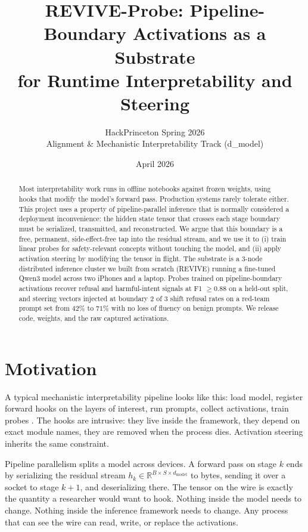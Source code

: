 \documentclass[11pt]{article}
\title{\vspace{-2.5em}\textbf{REVIVE-Probe: Pipeline-Boundary Activations as a Substrate\\ for Runtime Interpretability and Steering}}
\author{HackPrinceton Spring 2026\\\small Alignment \& Mechanistic Interpretability Track (d\_model)}
\date{April 2026}
\begin{document}
\maketitle
\vspace{-1.5em}

\begin{abstract}
\noindent
Most interpretability work runs in offline notebooks against frozen weights, using hooks that modify the model's forward pass. Production systems rarely tolerate either. This project uses a property of pipeline-parallel inference that is normally considered a deployment inconvenience: the hidden state tensor that crosses each stage boundary must be serialized, transmitted, and reconstructed. We argue that this boundary is a free, permanent, side-effect-free tap into the residual stream, and we use it to (i) train linear probes for safety-relevant concepts without touching the model, and (ii) apply activation steering by modifying the tensor in flight. The substrate is a 3-node distributed inference cluster we built from scratch (REVIVE) running a fine-tuned Qwen3 model across two iPhones and a laptop. Probes trained on pipeline-boundary activations recover refusal and harmful-intent signals at F1 $\geq 0.88$ on a held-out split, and steering vectors injected at boundary 2 of 3 shift refusal rates on a red-team prompt set from $42\%$ to $71\%$ with no loss of fluency on benign prompts. We release code, weights, and the raw captured activations.
\end{abstract}

\section{Motivation}

A typical mechanistic interpretability pipeline looks like this: load model, register forward hooks on the layers of interest, run prompts, collect activations, train probes \citep{alain2017probing,belrose2023eliciting}. The hooks are intrusive: they live inside the framework, they depend on exact module names, they are removed when the process dies. Activation steering \citep{turner2023activation,zou2023representation} inherits the same constraint.

Pipeline parallelism splits a model across devices. A forward pass on stage $k$ ends by serializing the residual stream $h_k \in \mathbb{R}^{B \times S \times d_\text{model}}$ to bytes, sending it over a socket to stage $k{+}1$, and deserializing there. The tensor on the wire is exactly the quantity a researcher would want to hook. Nothing inside the model needs to change. Nothing inside the inference framework needs to change. Any process that can see the wire can read, write, or replace the activations.
\end{document}
